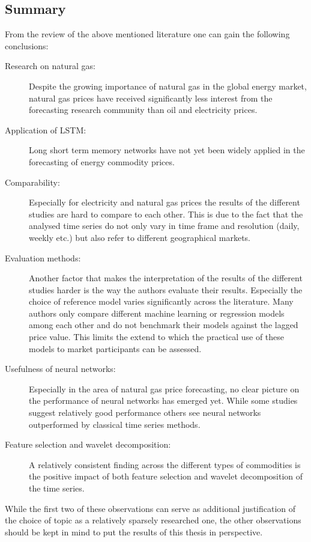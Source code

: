 

\subsection{Summary}
From the review of the above mentioned literature one can gain the following conclusions:
\begin{description}
\item[Research on natural gas:] Despite the growing importance of natural gas in the global energy market, natural gas prices have received significantly less interest from the forecasting research community than oil and electricity prices.
\item[Application of LSTM:] Long short term memory networks have not yet been widely applied in the forecasting of energy commodity prices.
\item[Comparability:] Especially for electricity and natural gas prices the results of the different studies are hard to compare to each other. This is due to the fact that the analysed time series do not only vary in time frame and resolution (daily, weekly etc.) but also refer to different geographical markets. 
\item[Evaluation methods:] Another factor that makes the interpretation of the results of the different studies harder is the way the authors evaluate their results. Especially the choice of reference model varies significantly across the literature. Many authors only compare different machine learning or regression models among each other and do not benchmark their models against the lagged price value. This limits the extend to which the practical use of these models to market participants can be assessed.
\item[Usefulness of neural networks:] Especially in the area of natural gas price forecasting, no clear picture on the performance of neural networks has emerged yet. While some studies suggest relatively good performance others see neural networks outperformed by classical time series methods.
\item[Feature selection and wavelet decomposition:] A relatively consistent finding across the different types of commodities is the positive impact of both feature selection and wavelet decomposition of the time series.
\end{description}
While the first two of these observations can serve as additional justification of the choice of topic as a relatively sparsely researched one, the other observations should be kept in mind to put the results of this thesis in perspective.